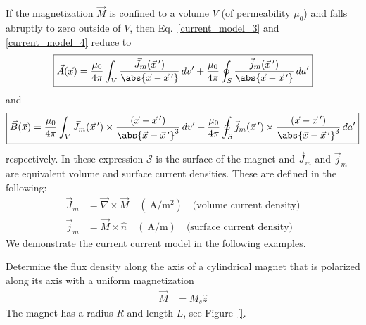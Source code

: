 \documentclass[12pt,a4paper,oneside]{book}
\begin{document}
\begin{onehalfspace}
If the magnetization $\vec{M}$ is confined to a volume $V$ (of permeability $\mu_0$) and falls abruptly to zero outside of $V$, then Eq.~\eqref{current_model_3} and \ref{current_model_4} reduce to
 \begin{equation}\label{current_model_5}
\boxed{	\begin{aligned}
		\vec{A}(\vec{x})=\frac{\mu_0}{4\pi}\int_{V}\frac{\vec{J}_m(\vec{x}\,')}{\abs{\vec{x}-\vec{x}\,'}}\,dv' +
		\frac{\mu_0}{4\pi}\oint_{S}\frac{\vec{j}_m(\vec{x}\,')}{\abs{\vec{x}-\vec{x}\,'}}\,da'
	\end{aligned}}
\end{equation}
and
 \begin{equation}\label{current_model_6}
\boxed{	\begin{aligned}
		\vec{B}(\vec{x})=\frac{\mu_0}{4\pi}\int_{V}\vec{J}_m(\vec{x}\,')\times\frac{(\vec{x}-\vec{x}\,')}{\abs{\vec{x}-\vec{x}\,'}^3}\,dv' + 
		\frac{\mu_0}{4\pi}\oint_{S}\vec{j}_m(\vec{x}\,')\times\frac{(\vec{x}-\vec{x}\,')}{\abs{\vec{x}-\vec{x}\,'}^3}\,da'
	\end{aligned}}
\end{equation}
respectively. In these expression $\mathcal{S}$ is the surface of the magnet and $\vec{J}_m$ and $\vec{j}_m$ are equivalent volume and surface current densities. These are defined in the following:
\begin{equation}\label{current_model_7}
\boxed{	\begin{aligned}
		\vec{J}_m &= \vec{\nabla}\times\vec{M}\quad(\SI{}{\ampere\per\square\meter})\quad\text{(volume current density)} \\[6pt]
		\vec{j}_m &= \vec{M}\times\hat{n}\quad(\SI{}{\ampere\per\meter})\quad\text{(surface current density)}
\end{aligned}}
\end{equation}
We demonstrate the current current model in the following examples.
\begin{example}
	Determine the flux density along the axis of a cylindrical magnet that is polarized along its axis with a uniform magnetization
	\begin{equation*}\label{}
		\begin{aligned}
				\vec{M} &= M_s\hat{z}
		\end{aligned}
	\end{equation*}
The magnet has a radius $R$ and length $L$, see Figure~\ref{}.


\end{example}
\end{onehalfspace}
\end{document}
